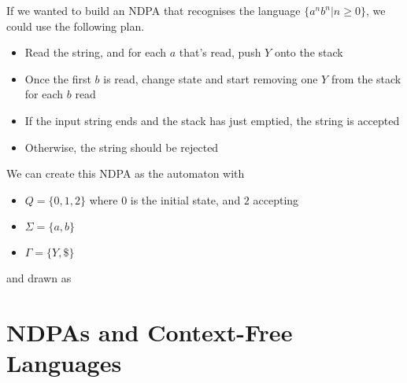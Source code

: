 \begin{example*}{}{}
  If we wanted to build an NDPA that recognises the language $\{a^n b^n | n \geq 0\}$, we could use the following plan.
  \begin{itemize}
    \item Read the string, and for each $a$ that's read, push $Y$ onto the stack
    \item Once the first $b$ is read, change state and start removing one $Y$ from the stack for each $b$ read
    \item If the input string ends and the stack has just emptied, the string is accepted
    \item Otherwise, the string should be rejected
  \end{itemize}

  We can create this NDPA as the automaton with
  \begin{itemize}
    \item $Q = \{0, 1, 2\}$ where $0$ is the initial state, and $2$ accepting
    \item $\Sigma = \{a, b\}$
    \item $\Gamma = \{Y, \$\}$
  \end{itemize}
  and drawn as
  \begin{center}
  \end{center}
\end{example*}

\section*{NDPAs and Context-Free Languages}

